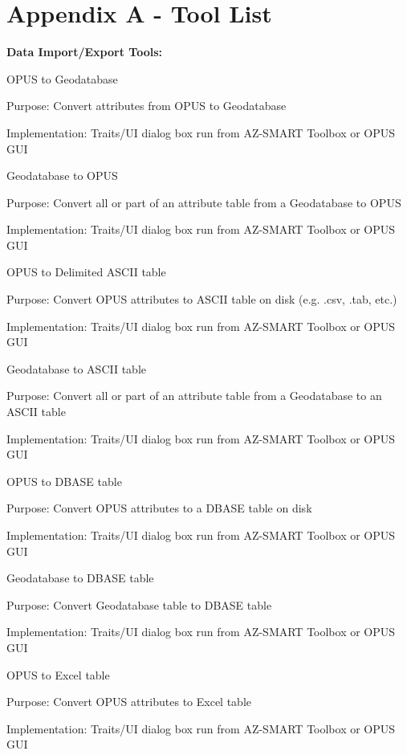 \section{Appendix A - Tool List}

\textbf{Data Import/Export Tools:}

\bigskip

OPUS to Geodatabase

Purpose: Convert attributes from OPUS to Geodatabase

Implementation: Traits/UI dialog box run from AZ-SMART Toolbox or OPUS GUI

\bigskip

Geodatabase to OPUS

Purpose: Convert all or part of an attribute table from a Geodatabase to OPUS

Implementation: Traits/UI dialog box run from AZ-SMART Toolbox or OPUS GUI

\bigskip

OPUS to Delimited ASCII table

Purpose: Convert OPUS attributes to ASCII table on disk (e.g. .csv, .tab, etc.)

Implementation: Traits/UI dialog box run from AZ-SMART Toolbox or OPUS GUI

\bigskip

Geodatabase to ASCII table

Purpose: Convert all or part of an attribute table from a Geodatabase to an ASCII table

Implementation: Traits/UI dialog box run from AZ-SMART Toolbox or OPUS GUI

\bigskip

OPUS to DBASE table

Purpose: Convert OPUS attributes to a DBASE table on disk

Implementation: Traits/UI dialog box run from AZ-SMART Toolbox or OPUS GUI

\bigskip

Geodatabase to DBASE table

Purpose: Convert Geodatabase table to DBASE table

Implementation: Traits/UI dialog box run from AZ-SMART Toolbox or OPUS GUI

\bigskip

OPUS to Excel table

Purpose: Convert OPUS attributes to Excel table

Implementation: Traits/UI dialog box run from AZ-SMART Toolbox or OPUS GUI

